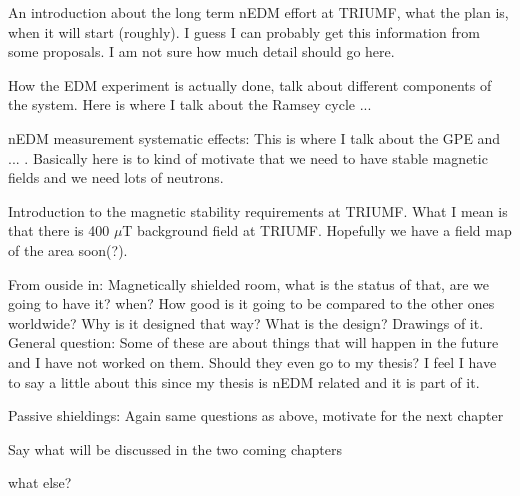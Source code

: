 \begin{description}
\item{An introduction about the long term nEDM effort at TRIUMF, what
  the plan is, when it will start (roughly). I guess I can probably
  get this information from some proposals. I am not sure how much
  detail should go here.}
  
\item{How the EDM experiment is actually done, talk about different
  components of the system. Here is where I talk about the Ramsey
  cycle ...}
  
\item{nEDM measurement systematic effects: This is where I talk about
  the GPE and ... . Basically here is to kind of motivate that we need
  to have stable magnetic fields and we need lots of neutrons.}
  
\item{Introduction to the magnetic stability requirements at
  TRIUMF. What I mean is that there is 400 $\mu$T background field at
  TRIUMF. Hopefully we have a field map of the area soon(?).}
  
\item{From ouside in: Magnetically shielded room, what is the status
  of that, are we going to have it? when? How good is it going to be
  compared to the other ones worldwide? Why is it designed that way?
  What is the design? Drawings of it. General question: Some of these
  are about things that will happen in the future and I have not
  worked on them. Should they even go to my thesis? I feel I have to
  say a little about this since my thesis is nEDM related and it is
  part of it.}
  
\item{Passive shieldings: Again same questions as above, motivate for
  the next chapter}

  
\item{Say what will be discussed in the two coming chapters}
  
\item{what else?}
\end{description}
